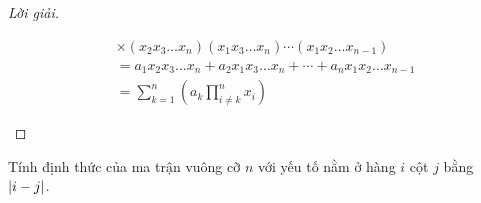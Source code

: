 \documentclass[class=nhvh-linear-algebra,crop=false]{standalone}
\begin{document}
\begin{proof}[Lời giải]
\begin{enumerate}[label = (\alph*)]
\begin{align*}
			       & \times (x_{2}x_{3}\ldots x_{n}) (x_{1}x_{3}\ldots x_{n}) \cdots (x_{1}x_{2}\ldots x_{n-1})                                                       \\
			       & = a_{1}x_{2}x_{3}\ldots x_{n} + a_{2}x_{1}x_{3}\ldots x_{n} + \cdots + a_{n}x_{1}x_{2}\ldots x_{n-1}                                             \\
			       & = \sum^{n}_{k = 1}\left(a_{k}\prod^{n}_{i\ne k}x_{i}\right)
		      \end{align*}
		      \endgroup{}
	\end{enumerate}
\end{proof}

\begin{exercise}
	Tính định thức của ma trận vuông cỡ $n$ với yếu tố nằm ở hàng $i$ cột $j$ bằng $\left|{i - j}\right|$.
\end{exercise}
\end{document}
